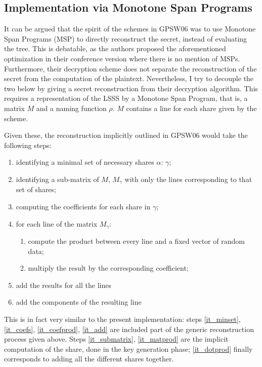 \documentclass{article}
\begin{document}
\subsection{Implementation via Monotone Span Programs}

It can be argued that the spirit of the schemes in GPSW06 was to use Monotone Span Programs (MSP) to directly reconstruct the secret, instead of evaluating the tree. This is debatable, as the authors proposed the aforementioned optimization in their conference version where there is no mention of MSPs. Furthermore, their decryption scheme does not separate the reconstruction of the secret from the computation of the plaintext. Nevertheless, I try to decouple the two below by giving a secret reconstruction from their decryption algorithm. This requires a representation of the LSSS by a  Monotone Span Program, that is, a matrix $M$ and a naming function $\rho$. $M$ contains a line for each share given by the scheme. 

Given these, the reconstruction implicitly outlined in GPSW06 would take the following steps:
\begin{enumerate}
\item \label{it_minset} identifying a minimal set of necessary shares $\alpha$: $\gamma$;
\item \label{it_submatrix}identifying a sub-matrix of $M$, $M_\gamma$ with only the lines corresponding to that set of shares;
\item \label{it_coefs}computing the coefficients for each share in $\gamma$;
\item for each line of the matrix $M_\gamma$:
\begin{enumerate}
	\item \label{it_matprod} compute the product between every line  and a fixed vector of random data; 
	\item \label{it_coefprod}multiply the result by the corresponding coefficient;
\end{enumerate}
\item \label{it_add} add the results for all the lines
\item \label{it_dotprod} add the components of the resulting line
\end{enumerate}

This is in fact very similar to the present implementation: steps \ref{it_minset}, \ref{it_coefs}, \ref{it_coefprod}, \ref{it_add} are included part of the generic reconstruction process given above. Steps \ref{it_submatrix}, \ref{it_matprod} are the implicit computation of the share, done in the key generation phase; \ref{it_dotprod} finally corresponds to adding all the different shares together.
\end{document}
